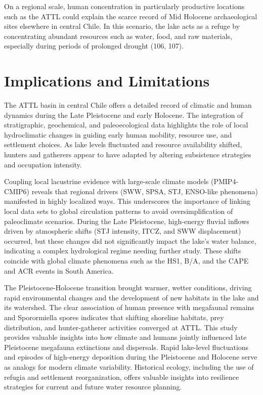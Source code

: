 \documentclass[
]{article}
\begin{document}
On a regional scale, human concentration in particularly productive
locations such as the ATTL could explain the scarce record of Mid
Holocene archaeological sites elsewhere in central Chile. In this
scenario, the lake acts as a refuge by concentrating abundant resources
such as water, food, and raw materials, especially during periods of
prolonged drought (106, 107).

\section{Implications and
Limitations}\label{implications-and-limitations}

The ATTL basin in central Chile offers a detailed record of climatic and
human dynamics during the Late Pleistocene and early Holocene. The
integration of stratigraphic, geochemical, and paleoecological data
highlights the role of local hydroclimatic changes in guiding early
human mobility, resource use, and settlement choices. As lake levels
fluctuated and resource availability shifted, hunters and gatherers
appear to have adapted by altering subsistence strategies and occupation
intensity.

Coupling local lacustrine evidence with large-scale climate models
(PMIP4-CMIP6) reveals that regional drivers (SWW, SPSA, STJ, ENSO-like
phenomena) manifested in highly localized ways. This underscores the
importance of linking local data sets to global circulation patterns to
avoid oversimplification of paleoclimate scenarios. During the Late
Pleistocene, high-energy fluvial inflows driven by atmospheric shifts
(STJ intensity, ITCZ, and SWW displacement) occurred, but these changes
did not significantly impact the lake's water balance, indicating a
complex hydrological regime needing further study. These shifts coincide
with global climate phenomena such as the HS1, B/A, and the CAPE and ACR
events in South America.

The Pleistocene-Holocene transition brought warmer, wetter conditions,
driving rapid environmental changes and the development of new habitats
in the lake and its watershed. The clear association of human presence
with megafaunal remains and Sporormiella spores indicates that shifting
shoreline habitats, prey distribution, and hunter-gatherer activities
converged at ATTL. This study provides valuable insights into how
climate and humans jointly influenced late Pleistocene megafauna
extinctions and dispersals. Rapid lake-level fluctuations and episodes
of high-energy deposition during the Pleistocene and Holocene serve as
analogs for modern climate variability. Historical ecology, including
the use of refugia and settlement reorganization, offers valuable
insights into resilience strategies for current and future water
resource planning.
\end{document}
